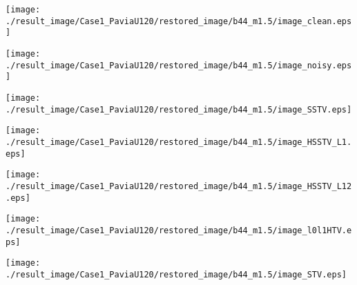 \begin{figure*}[t]
	\begin{center}
		\begin{minipage}{0.125\hsize}
			\centerline{\texttt{[image: ./result\_image/Case1\_PaviaU120/restored\_image/b44\_m1.5/image\_clean.eps]}} %
		\end{minipage}
		\begin{minipage}{0.125\hsize}
			\centerline{\texttt{[image: ./result\_image/Case1\_PaviaU120/restored\_image/b44\_m1.5/image\_noisy.eps]}} %
		\end{minipage}
		\begin{minipage}{0.125\hsize}
			\centerline{\texttt{[image: ./result\_image/Case1\_PaviaU120/restored\_image/b44\_m1.5/image\_SSTV.eps]}} %
		\end{minipage}
		\begin{minipage}{0.125\hsize}
			\centerline{\texttt{[image: ./result\_image/Case1\_PaviaU120/restored\_image/b44\_m1.5/image\_HSSTV\_L1.eps]}} %
		\end{minipage}
		\begin{minipage}{0.125\hsize}
			\centerline{\texttt{[image: ./result\_image/Case1\_PaviaU120/restored\_image/b44\_m1.5/image\_HSSTV\_L12.eps]}} %
		\end{minipage}
		\begin{minipage}{0.125\hsize}
			\centerline{\texttt{[image: ./result\_image/Case1\_PaviaU120/restored\_image/b44\_m1.5/image\_l0l1HTV.eps]}} %
		\end{minipage}
		\begin{minipage}{0.125\hsize}
			\centerline{\texttt{[image: ./result\_image/Case1\_PaviaU120/restored\_image/b44\_m1.5/image\_STV.eps]}} %
		\end{minipage}
		\begin{minipage}{0.050\hsize}
			\centerline{\hspace{\hsize}} %
		\end{minipage}
		
		\vspace{1mm}
		

\end{center}
\end{figure*}
